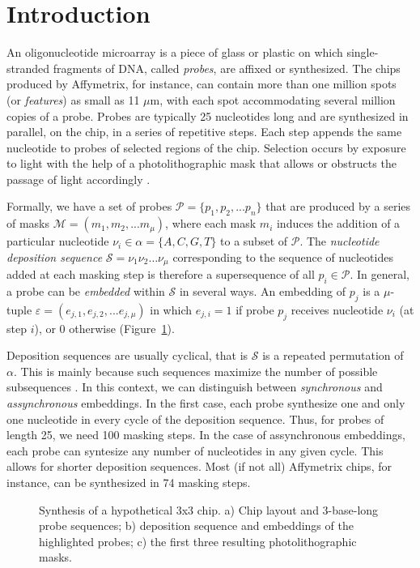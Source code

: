 \documentclass{bioinfo}
\begin{document}
\section{Introduction}

An oligonucleotide microarray is a piece of glass or plastic on which single-stranded fragments of DNA, called \emph{probes}, are affixed or synthesized. The chips produced by Affymetrix, for instance, can contain more than one million spots (or \emph{features}) as small as 11 $\mu$m, with each spot accommodating several million copies of a probe. Probes are typically 25 nucleotides long and are synthesized in parallel, on the chip, in a series of repetitive steps. Each step appends the same nucleotide to probes of selected regions of the chip. Selection occurs by exposure to light with the help of a photolithographic mask that allows or obstructs the passage of light accordingly \citep{FODOR91}.

Formally, we have a set of probes $\mathcal{P} = \{p_{1}, p_{2}, ... p_{n}\}$ that are produced by a series of masks $\mathcal{M} = (m_{1}, m_{2}, ... m_{\mu})$, where each mask $m_{i}$ induces the addition of a particular nucleotide $\nu_{i} \in \alpha = \{A, C, G, T\}$ to a subset of $\mathcal{P}$. The \emph{nucleotide deposition sequence} $\mathcal{S} = \nu_{1} \nu_{2} \ldots \nu_{\mu}$ corresponding to the sequence of nucleotides added at each masking step is therefore a supersequence of all $p_{i} \in \mathcal{P}$. In general, a probe can be \emph{embedded} within $\mathcal{S}$ in several ways. An embedding of $p_{j}$ is a $\mu$-tuple $\varepsilon = (e_{j,1}, e_{j,2}, ... e_{j,\mu})$ in which $e_{j,i} = 1$ if probe $p_{j}$ receives nucleotide $\nu_{i}$ (at step $i$), or 0 otherwise (Figure~\ref{fig:01}).

Deposition sequences are usually cyclical, that is $\mathcal{S}$ is a repeated permutation of $\alpha$. This is mainly because such sequences maximize the number of possible subsequences \citep{CHASE76}. In this context, we can distinguish between \emph{synchronous} and \emph{assynchronous} embeddings. In the first case, each probe synthesize one and only one nucleotide in every cycle of the deposition sequence. Thus, for probes of length 25, we need 100 masking steps. In the case of assynchronous embeddings, each probe can syntesize any number of nucleotides in any given cycle. This allows for shorter deposition sequences. Most (if not all) Affymetrix chips, for instance, can be synthesized in 74 masking steps.

\begin{figure}
\caption{Synthesis of a hypothetical 3x3 chip. a) Chip layout and 3-base-long probe sequences; b) deposition sequence and embeddings of the highlighted probes; c) the first three resulting photolithographic masks.}\label{fig:01}
\end{figure}
\end{document}
